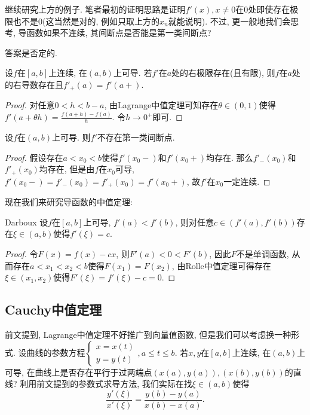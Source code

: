 继续研究上方的例子. 笔者最初的证明思路是证明$f'(x), x \neq 0$在$0$处即使存在极限也不是$0$(这当然是对的, 例如只取上方的$x_n$就能说明). 不过, 更一般地我们会思考, 导函数如果不连续, 其间断点是否能是第一类间断点? 

答案是否定的. 

\begin{lemma}{}
	设$f$在$[a,b]$上连续, 在$(a,b)$上可导. 若$f'$在$a$处的右极限存在(且有限), 则$f$在$a$处的右导数存在且$f'_+(a)=f'(a+)$. 
\end{lemma}
\begin{proof}
	对任意$0<h<b-a$, 由Lagrange中值定理可知存在$\theta \in (0,1)$使得$f'(a+\theta h) = \frac{f(a+h)-f(a)}{h}$. 令$h \to 0^+$即可. 
\end{proof}

\begin{proposition}{}
	设$f$在$(a,b)$上可导. 则$f'$不存在第一类间断点. 
\end{proposition}
\begin{proof}
	假设存在$a<x_0 <b$使得$f'(x_0-)$和$f'(x_0+)$均存在. 那么$f'_-(x_0)$和$f'_+(x_0)$均存在, 但是由$f$在$x_0$可导, $f'(x_0-)=f'_-(x_0)=f'_+(x_0)=f'(x_0+)$, 故$f'$在$x_0$一定连续. 
\end{proof}

现在我们来研究导函数的中值定理: 

\begin{theorem}{Darboux}
	设$f$在$[a,b]$上可导, $f'(a)<f'(b)$, 则对任意$c \in (f'(a),f'(b))$存在$\xi \in (a,b)$使得$f'(\xi) = c$. 
\end{theorem}
\begin{proof}
	令$F(x)=f(x)-cx$, 则$F'(a)<0<F'(b)$, 因此$F$不是单调函数, 从而存在$a < x_1 < x_2 < b$使得$F(x_1)=F(x_2)$, 由Rolle中值定理可得存在$\xi \in (x_1,x_2)$使得$F'(\xi)=f'(\xi)-c=0$. 
\end{proof}



\subsection{Cauchy中值定理}

前文提到, Lagrange中值定理不好推广到向量值函数, 但是我们可以考虑换一种形式. 设曲线的参数方程$\begin{cases}
	x=x(t) \\ y=y(t)
\end{cases},a \leq t \leq b$. 若$x,y$在$[a,b]$上连续, 在$(a,b)$上可导, 在曲线上是否存在平行于过两端点$(x(a),y(a)),(x(b),y(b))$的直线? 利用前文提到的参数式求导方法, 我们实际在找$\xi \in (a,b)$使得$$\frac{y'(\xi)}{x'(\xi)} = \frac{y(b)-y(a)}{x(b)-x(a)}. $$

